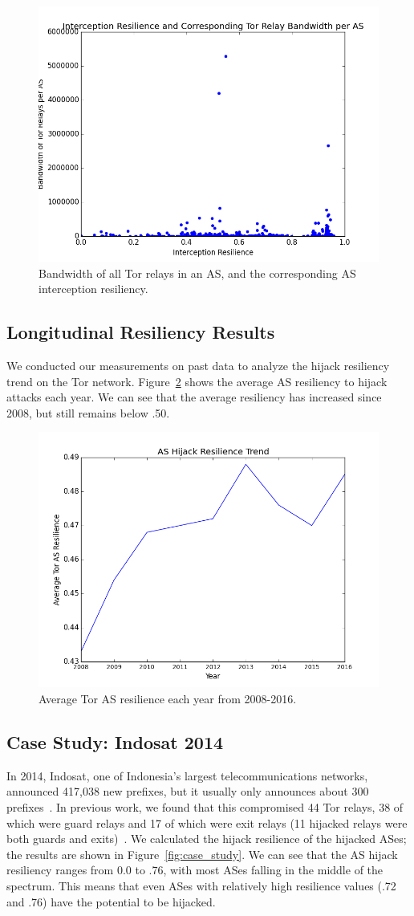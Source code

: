 \begin{figure}
\centering
\includegraphics[width=.5\textwidth]{interception_bandwidth}
\caption{Bandwidth of all Tor relays in an AS, and the corresponding AS interception resiliency.}
\label{fig:interception_bw}
\end{figure}

\subsection{Longitudinal Resiliency Results}

We conducted our measurements on past data to analyze the hijack resiliency trend on the Tor network.  Figure~\ref{fig:resilience_trend} shows the average AS resiliency to hijack attacks each year.  We can see that the average resiliency has increased since 2008, but still remains below .50.  

\begin{figure}
\centering
\includegraphics[width=.5\textwidth]{hijack_resilience_trend}
\caption{Average Tor AS resilience each year from 2008-2016.}
\label{fig:resilience_trend}
\end{figure}

\subsection{Case Study: Indosat 2014}
In 2014, Indosat, one of Indonesia's largest telecommunications networks, announced 417,038 new prefixes, but it usually only announces about 300 prefixes~\cite{indosat2014}.  In previous work, we found that this compromised 44 Tor relays, 38 of which were guard relays and 17 of which were exit relays (11 hijacked relays were both guards and exits)~\cite{sun2015raptor}.  We calculated the hijack resilience of the hijacked ASes; the results are shown in Figure~\ref{fig:case_study}.  We can see that the AS hijack resiliency ranges from 0.0 to .76, with most ASes falling in the middle of the spectrum. This means that even ASes with relatively high resilience values (.72 and .76) have the potential to be hijacked.  


